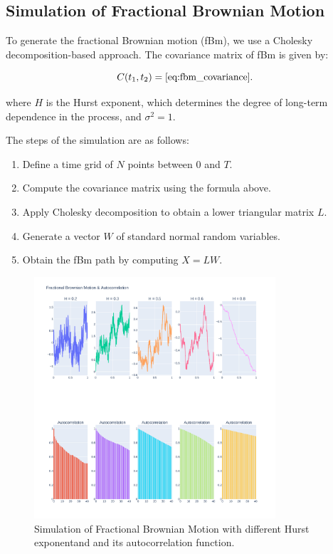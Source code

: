 \documentclass[11pt]{extarticle}
\begin{document}
\subsection{Simulation of Fractional Brownian Motion}

To generate the fractional Brownian motion (fBm), we use a Cholesky decomposition-based approach. The covariance matrix of fBm is given by:

\begin{equation}
C(t_1, t_2) = \eqref{eq:fbm_covariance}.
\end{equation}

where \( H \) is the Hurst exponent, which determines the degree of long-term dependence in the process, and \( \sigma^2 = 1 \).

The steps of the simulation are as follows:
\begin{enumerate}
    \item Define a time grid of \( N \) points between \( 0 \) and \( T \).
    \item Compute the covariance matrix using the formula above.
    \item Apply Cholesky decomposition to obtain a lower triangular matrix \( L \).
    \item Generate a vector \( W \) of standard normal random variables.
    \item Obtain the fBm path by computing \( X = L W \).
\end{enumerate}

\begin{figure}[!ht]
    \centering
    \includegraphics[width=0.8\textwidth]{img/fdm_autocorr}
    \caption{Simulation of Fractional Brownian Motion with different Hurst exponentand and its autocorrelation function.}
    \label{fig:fbm_autocorr}
\end{figure}
\end{document}
